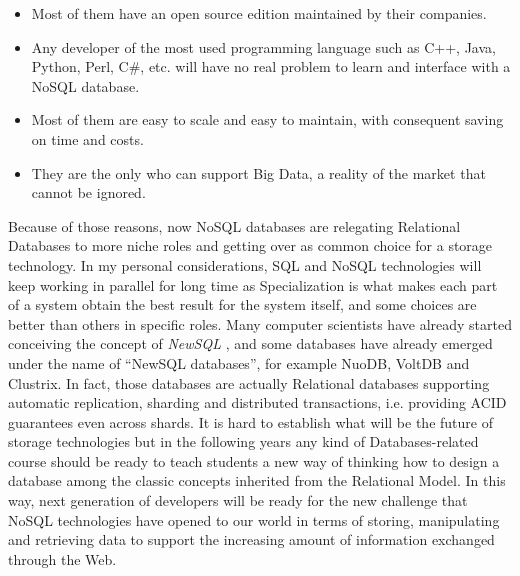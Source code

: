 \begin{itemize}
	\item Most of them have an open source edition maintained by their companies.
	\item Any developer of the most used programming language such as C++, Java, Python, Perl, C\#, etc. will have no real problem to learn and interface with a NoSQL database.
	\item Most of them are easy to scale and easy to maintain, with consequent saving on time and costs.
	\item They are the only who can support Big Data, a reality of the market that cannot be ignored.
\end{itemize}
Because of those reasons, now NoSQL databases are relegating Relational Databases to more niche roles and getting over as common choice for a storage technology.
In my personal considerations, SQL and NoSQL technologies will keep working in parallel for long time as Specialization is what makes each part of a system obtain the best result for the system itself, and some choices are better than others in specific roles.
Many computer scientists have already started conceiving the concept of \textit{NewSQL} \cite{corbellini}, and some databases have already emerged under the name of “NewSQL databases”, for example NuoDB, VoltDB and Clustrix.
In fact, those databases are actually Relational databases supporting automatic replication, sharding and distributed transactions, i.e. providing ACID guarantees even across shards. 
It is hard to establish what will be the future of storage technologies but in the following years any kind of Databases-related course should be ready to teach students a new way of thinking how to design a database among the classic concepts inherited from the Relational Model.
In this way, next generation of developers will be ready for the new challenge  that NoSQL technologies have opened to our world in terms of storing, manipulating and retrieving data to support the increasing amount of information exchanged through the Web.

